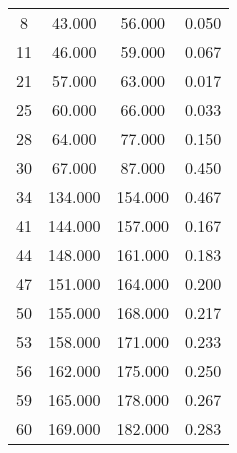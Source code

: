 % 
\begin{tabular}{cccc}
  \hline
  \hline
8 & 43.000 & 56.000 & 0.050 \\ 
  11 & 46.000 & 59.000 & 0.067 \\ 
  21 & 57.000 & 63.000 & 0.017 \\ 
  25 & 60.000 & 66.000 & 0.033 \\ 
  28 & 64.000 & 77.000 & 0.150 \\ 
  30 & 67.000 & 87.000 & 0.450 \\ 
  34 & 134.000 & 154.000 & 0.467 \\ 
  41 & 144.000 & 157.000 & 0.167 \\ 
  44 & 148.000 & 161.000 & 0.183 \\ 
  47 & 151.000 & 164.000 & 0.200 \\ 
  50 & 155.000 & 168.000 & 0.217 \\ 
  53 & 158.000 & 171.000 & 0.233 \\ 
  56 & 162.000 & 175.000 & 0.250 \\ 
  59 & 165.000 & 178.000 & 0.267 \\ 
  60 & 169.000 & 182.000 & 0.283 \\ 
   \hline
\end{tabular}

